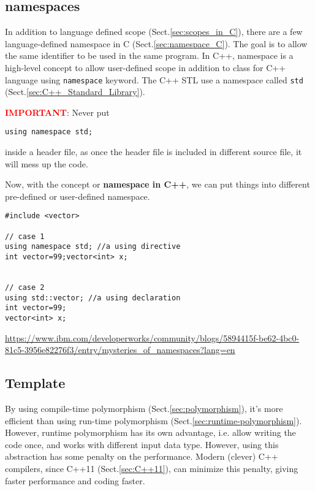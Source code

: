 \subsection{namespaces}
\label{sec:namespace_C++}

In addition to language defined scope (Sect.\ref{sec:scopes_in_C}), there are a
few language-defined namespace in C (Sect.\ref{sec:namespace_C}).
The goal is to allow the same identifier to be used in the same program.
In C++, namespace is a high-level concept to allow user-defined scope in
addition to class for C++ language using
\verb!namespace! keyword. The C++ STL use a namespace called \verb!std!
(Sect.\ref{sec:C++_Standard_Library}).

\textcolor{red}{\bf IMPORTANT}: Never put 
\begin{lstlisting}
using namespace std;
\end{lstlisting}
inside a header file, as once the header file is included in different source
file, it will mess up the code.

Now, with the concept or {\bf namespace in C++}, we can put things into
different pre-defined or user-defined namespace.

\begin{verbatim}
#include <vector>

// case 1
using namespace std; //a using directive
int vector=99;vector<int> x; 


// case 2
using std::vector; //a using declaration
int vector=99;
vector<int> x;   
\end{verbatim}
\sloppy\url{https://www.ibm.com/developerworks/community/blogs/5894415f-be62-4bc0-81c5-3956e82276f3/entry/mysteries_of_namespaces?lang=en}




\subsection{Template}
\label{sec:C++98_template}
\label{sec:template-C++98}

\begin{mdframed}

By using compile-time polymorphism (Sect.\ref{sec:polymorphism}), it's more
efficient than using run-time polymorphism
(Sect.\ref{sec:runtime-polymorphism}). However, runtime polymorphism has its own
advantage, i.e. allow writing the code once, and works with different input data
type. However, using this abstraction has some penalty on the performance.
Modern (clever) C++ compilers, since C++11 (Sect.\ref{sec:C++11}), can minimize
this penalty, giving faster performance and coding faster. 
\end{mdframed}


